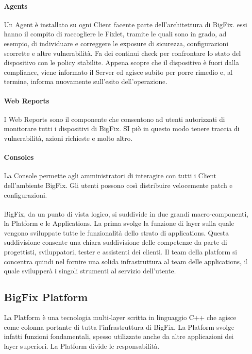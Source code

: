 \paragraph{Agents}
Un Agent è installato su ogni Client facente parte dell'architettura di BigFix. essi hanno il compito di raccogliere le Fixlet, tramite le quali sono in grado, ad esempio, di individuare e correggere le exposure di sicurezza, configurazioni scorrette e altre vulnerabilità. Fa dei continui check per confrontare lo stato del dispositivo con le policy stabilite. Appena scopre che il dispositivo è fuori dalla compliance, viene informato il Server ed agisce subito per porre rimedio e, al termine, informa nuovamente sull'esito dell'operazione.
\paragraph{Web Reports}
I Web Reports sono il componente che consentono ad utenti autorizzati di monitorare tutti i dispositivi di BigFix. SI piò in questo modo tenere traccia di vulnerabilità, azioni richieste e molto altro.
\paragraph{Consoles}
La Console permette agli amministratori di interagire con tutti i Client dell'ambiente BigFix. Gli utenti possono così distribuire velocemente patch e configurazioni.
\paragraph{}
BigFix, da un punto di vista logico, si suddivide in due grandi macro-componenti, la Platform e le Applications. La prima svolge la funzione di layer sulla quale vengono sviluppate tutte le funzionalità dello strato di applications. Questa suddivisione consente una chiara suddivisione delle competenze da parte di progettisti, sviluppatori, tester e assistenti dei clienti. Il team della platform si concentra quindi nel fornire una solida infrastruttura al team delle applications, il quale svilupperà i singoli strumenti al servizio dell'utente.
\subsection{BigFix Platform}
La Platform è una tecnologia multi-layer scritta in linguaggio C++ che agisce come colonna portante di tutta l'infrastruttura di BigFix. La Platform svolge infatti funzioni fondamentali, spesso utilizzate anche da altre applicazioni dei layer superiori. La Platform divide le responsabilità.
